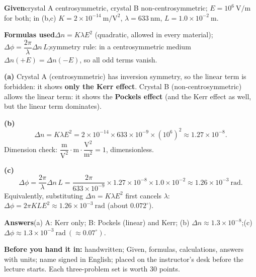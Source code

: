 \documentclass[11pt]{ctexart}
\begin{document}
\textbf{Given}\quad crystal A centrosymmetric, crystal B non-centrosymmetric; $E=10^{6}\ \mathrm{V/m}$ for both;
in (b,c) $K=2\times10^{-14}\ \mathrm{m/V^{2}}$, $\lambda=633\ \mathrm{nm}$, $L=1.0\times10^{-2}\ \mathrm{m}$.

\textbf{Formulas used}\quad $\Delta n=K\lambda E^{2}$ (quadratic, allowed in every material);\quad
$\Delta\phi=\dfrac{2\pi}{\lambda}\Delta n\,L$;\quad symmetry rule: in a centrosymmetric medium
$\Delta n(+E)=\Delta n(-E)$, so all odd terms vanish.

\textbf{(a)} Crystal A (centrosymmetric) has inversion symmetry, so the linear term is forbidden:
it shows \textbf{only the Kerr effect}. Crystal B (non-centrosymmetric) allows the linear term: it shows the
\textbf{Pockels effect} (and the Kerr effect as well, but the linear term dominates).

\textbf{(b)}
\begin{equation}
\Delta n=K\lambda E^{2}=2\times10^{-14}\times633\times10^{-9}\times\left(10^{6}\right)^{2}
\approx1.27\times10^{-8}.
\end{equation}
Dimension check: $\dfrac{\mathrm{m}}{\mathrm{V^{2}}}\cdot\mathrm{m}\cdot\dfrac{\mathrm{V^{2}}}{\mathrm{m^{2}}}=1$, dimensionless.

\textbf{(c)}
\begin{equation}
\Delta\phi=\frac{2\pi}{\lambda}\Delta n\,L
=\frac{2\pi}{633\times10^{-9}}\times1.27\times10^{-8}\times1.0\times10^{-2}
\approx1.26\times10^{-3}\ \mathrm{rad}.
\end{equation}
Equivalently, substituting $\Delta n=K\lambda E^{2}$ first cancels $\lambda$:
$\Delta\phi=2\pi KLE^{2}\approx1.26\times10^{-3}\ \mathrm{rad}$ (about $0.072^\circ$).

\textbf{Answers}\quad (a) A: Kerr only; B: Pockels (linear) and Kerr;\quad
(b) $\Delta n\approx1.3\times10^{-8}$;\quad (c) $\Delta\phi\approx1.3\times10^{-3}\ \mathrm{rad}\ (\approx0.07^\circ)$.

\vspace{6pt}
{\small\color{inkgray}\textbf{Before you hand it in:} handwritten; Given, formulas, calculations, answers with
units; name signed in English; placed on the instructor's desk before the lecture starts. Each three-problem
set is worth 30 points.}
\end{document}
